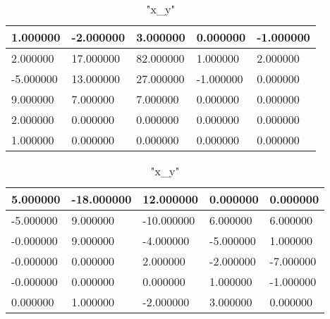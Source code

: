 \documentclass[12pt]{article}
\begin{document}
\begin{table}[h]
\caption { "x_y" }
\center
\begin{tabular} {|l|l|l|l|l|}
 \hline
 1.000000 & -2.000000 & 3.000000 & 0.000000 & -1.000000 \\ \hline 
 2.000000 & 17.000000 & 82.000000 & 1.000000 & 2.000000 \\ \hline 
 -5.000000 & 13.000000 & 27.000000 & -1.000000 & 0.000000 \\ \hline 
 9.000000 & 7.000000 & 7.000000 & 0.000000 & 0.000000 \\ \hline 
 2.000000 & 0.000000 & 0.000000 & 0.000000 & 0.000000 \\ \hline 
 1.000000 & 0.000000 & 0.000000 & 0.000000 & 0.000000 \\ \hline 

\end{tabular}
\end{table} 
\begin{table}[h]
\caption { "x_y" }
\center
\begin{tabular} {|l|l|l|l|l|}
 \hline
 5.000000 & -18.000000 & 12.000000 & 0.000000 & 0.000000 \\ \hline 
 -5.000000 & 9.000000 & -10.000000 & 6.000000 & 6.000000 \\ \hline 
 -0.000000 & 9.000000 & -4.000000 & -5.000000 & 1.000000 \\ \hline 
 -0.000000 & 0.000000 & 2.000000 & -2.000000 & -7.000000 \\ \hline 
 -0.000000 & 0.000000 & 0.000000 & 1.000000 & -1.000000 \\ \hline 
 0.000000 & 1.000000 & -2.000000 & 3.000000 & 0.000000 \\ \hline 

\end{tabular}
\end{table} 
\end{document}
